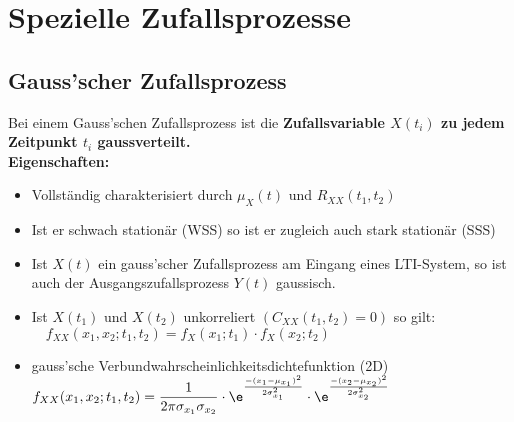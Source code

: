 		\section{Spezielle Zufallsprozesse}
			\subsection{Gauss'scher Zufallsprozess}
				Bei einem Gauss'schen Zufallsprozess ist die \textbf{Zufallsvariable $X(t_i)$ zu jedem Zeitpunkt $t_i$ gaussverteilt.}\\[0.1cm]
				\textbf{Eigenschaften:}\\[-0.6cm]
				\begin{itemize}
					\item Vollständig charakterisiert durch $\mu_X(t)$ und $R_{XX}(t_1,t_2)$\\[-0.6cm]
					\item Ist er schwach stationär (WSS) so ist er zugleich auch stark stationär (SSS)\\[-0.6cm]
					\item Ist $X(t)$ ein gauss'scher Zufallsprozess am Eingang eines LTI-System, so ist auch der Ausgangszufallsprozess $Y(t)$ gaussisch.\\[-0.6cm]
					\item Ist $X(t_1)$ und $X(t_2)$ unkorreliert $(C_{XX}(t_1,t_2) = 0)$ so gilt:$\quad f_{XX}(x_1,x_2;t_1,t_2) = f_X(x_1;t_1)\cdot f_X(x_2;t_2)$\\[-0.6cm]
					\item gauss'sche Verbundwahrscheinlichkeitsdichtefunktion (2D)\\[0.1cm]
						$f_{XX}(x_1,x_2;t_1,t_2) = \dfrac{1}{2\pi\sigma_{x_1}\sigma_{x_2}}\cdot \e^{\frac{-(x_1-\mu_{x_1})^2}{2\sigma_{x_1}^2}}\cdot \e^{\frac{-(x_2-\mu_{x_2})^2}{2\sigma_{x_2}^2}}$
				\end{itemize}

